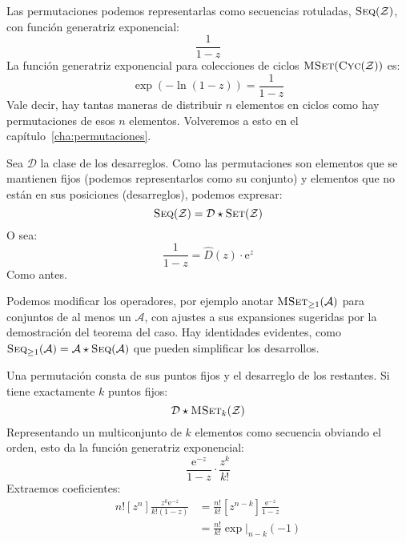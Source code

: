   Las permutaciones
  podemos representarlas como secuencias rotuladas,
  \(\operatorname{\textsc{Seq}}(\mathcal{Z})\),
  con función generatriz exponencial:
  \begin{equation*}
    \frac{1}{1 - z}
  \end{equation*}
  La función generatriz exponencial
  para colecciones de ciclos \(\operatorname{\textsc{MSet}}(\operatorname{\textsc{Cyc}}(\mathcal{Z}))\) es:
  \begin{equation*}
    \exp( -\ln(1 - z))
      = \frac{1}{1 - z}
  \end{equation*}
  Vale decir,
  hay tantas maneras de distribuir \(n\) elementos en ciclos
  como hay permutaciones de esos \(n\) elementos.
  Volveremos a esto en el capítulo~\ref{cha:permutaciones}.

  Sea \(\mathcal{D}\) la clase de los desarreglos.%
  Como las permutaciones son elementos que se mantienen fijos
  (podemos representarlos como su conjunto)
  y elementos que no están en sus posiciones
  (desarreglos),
  podemos expresar:
  \begin{equation*}
    \operatorname{\textsc{Seq}}(\mathcal{Z})
      = \mathcal{D} \star \operatorname{\textsc{Set}}(\mathcal{Z})
  \end{equation*}
  O sea:
  \begin{equation*}
    \frac{1}{1 - z}
      = \widehat{D}(z) \cdot \mathrm{e}^z
  \end{equation*}
  Como antes.

  Podemos modificar los operadores,
  por ejemplo anotar \(\operatorname{\textsc{MSet}}_{\ge 1}(\mathcal{A})\)
  para conjuntos de al menos un \(\mathcal{A}\),
  con ajustes a sus expansiones
  sugeridas por la demostración del teorema del caso.
  Hay identidades evidentes,
  como
  \(\operatorname{\textsc{Seq}}_{\ge 1}(\mathcal{A})
      = \mathcal{A} \star \operatorname{\textsc{Seq}}(\mathcal{A})\)
  que pueden simplificar los desarrollos.

  Una permutación consta de sus puntos fijos
  y el desarreglo de los restantes.
  Si tiene exactamente \(k\) puntos fijos:
  \begin{equation*}
    \mathcal{D} \star \operatorname{\textsc{MSet}}_k(\mathcal{Z})
  \end{equation*}
  Representando un multiconjunto de \(k\) elementos
  como secuencia obviando el orden,
  esto da la función generatriz exponencial:%
  \begin{equation*}
    \frac{\mathrm{e}^{-z}}{1 - z} \cdot \frac{z^k}{k!}
  \end{equation*}
  Extraemos coeficientes:
  \begin{align*}
    n! \left[ z^n \right] \frac{z^k \mathrm{e}^{-z}}{k! (1 - z)}
      &= \frac{n!}{k!} \left[ z^{n - k} \right]
			 \frac{\mathrm{e}^{-z}}{1 - z} \\
      &= \frac{n!}{k!} \exp \rvert_{n - k} (-1)
  \end{align*}

